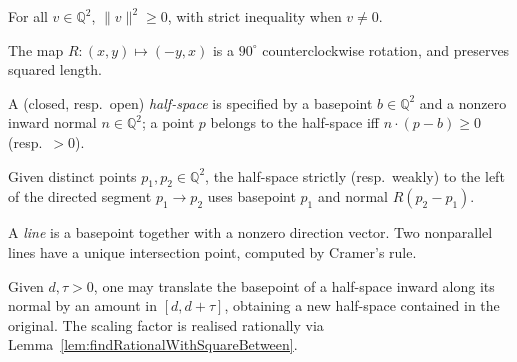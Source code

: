 \begin{lemma}
  \label{lem:lengthSq-pos}
  \leanok
  For all $v \in \mathbb{Q}^2$, $\lVert v\rVert^2 \ge 0$, with strict
  inequality when $v \ne 0$.
\end{lemma}

\begin{definition}
  \label{def:rotate90}
  \leanok
  The map $R : (x, y) \mapsto (-y, x)$ is a $90^\circ$ counterclockwise
  rotation, and preserves squared length.
\end{definition}

\begin{definition}
  \label{def:halfspace}
  \leanok
  A (closed, resp.\ open) \emph{half-space} is specified by a basepoint
  $b \in \mathbb{Q}^2$ and a nonzero inward normal $n \in \mathbb{Q}^2$;
  a point $p$ belongs to the half-space iff $n \cdot (p - b) \ge 0$
  (resp.\ $> 0$).
\end{definition}

\begin{definition}
  \label{def:toLeft}
  \leanok
  Given distinct points $p_1, p_2 \in \mathbb{Q}^2$, the half-space
  strictly (resp.\ weakly) to the left of the directed segment
  $p_1 \to p_2$ uses basepoint $p_1$ and normal $R(p_2 - p_1)$.
\end{definition}

\begin{definition}
  \label{def:line}
  \leanok
  A \emph{line} is a basepoint together with a nonzero direction vector.
  Two nonparallel lines have a unique intersection point, computed by
  Cramer's rule.
\end{definition}

\begin{definition}
  \label{def:moveInward}
  \leanok
  Given $d, \tau > 0$, one may translate the basepoint of a half-space
  inward along its normal by an amount in $[d, d+\tau]$, obtaining a new
  half-space contained in the original. The scaling factor is realised
  rationally via Lemma~\ref{lem:findRationalWithSquareBetween}.
\end{definition}

